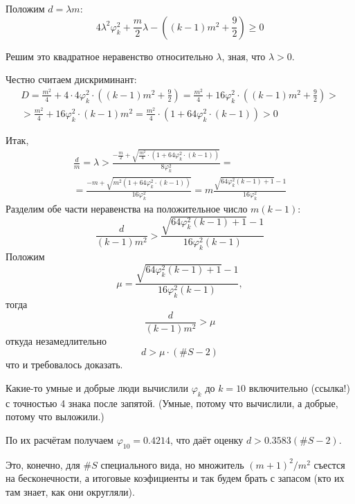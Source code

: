 Положим $d = \lambda m$:
\begin{equation}
	 4 \lambda^2 \varphi_k^2 + \frac{m}{2} \lambda - \left( (k-1)m^2 + \frac{9}{2}\right) \geq 0
\end{equation}

Решим это квадратное неравенство относительно $\lambda$,
зная, что $\lambda > 0$.

Честно считаем дискриминант:
\begin{multline}
	D =
	\frac{m^2}{4} + 4 \cdot 4 \varphi_k^2 \cdot \left( (k-1)m^2 + \frac{9}{2}\right)
	=
	\frac{m^2}{4} + 16 \varphi_k^2 \cdot \left( (k-1)m^2 + \frac{9}{2}\right)
	>\\>
	\frac{m^2}{4} + 16 \varphi_k^2 \cdot (k-1)m^2
	=
	\frac{m^2}{4} \cdot (1 + 64 \varphi_k^2 \cdot (k-1))
	> 0
\end{multline}

Итак,
\begin{multline}
	\frac{d}{m} = \lambda >
	\frac{-\frac{m}{2} + \sqrt{\frac{m^2}{4} \cdot (1 + 64 \varphi_k^2 \cdot (k-1))} }{8 \varphi_k^2}
	=\\=
	\frac{-m + \sqrt{m^2  (1 + 64 \varphi_k^2 \cdot (k-1))} }{16 \varphi_k^2}
	=
	m\frac{ \sqrt{ 64 \varphi_k^2 (k-1) + 1} -1 }{16 \varphi_k^2}
\end{multline}
Разделим обе части неравенства на положительное число $m(k-1)$:
\begin{equation}
	\frac{d}{(k-1)m^2}
	>
	\frac{ \sqrt{ 64 \varphi_k^2 (k-1) + 1} -1 }{16 \varphi_k^2 (k-1)}
\end{equation}
Положим
\begin{equation}
	\mu = \frac{ \sqrt{ 64 \varphi_k^2 (k-1) + 1} -1 }{16 \varphi_k^2 (k-1)},
\end{equation}
тогда
\begin{equation}
	\frac{d}{(k-1)m^2}
	>
	\mu
\end{equation}
откуда незамедлительно
\begin{equation}
	d > \mu \cdot (\#S-2)
\end{equation}
что и требовалось доказать.

Какие-то умные и добрые люди вычислили $\varphi_k$ до $k=10$ включительно (ссылка!) с точностью 4 знака после запятой.
(Умные, потому что вычислили, а добрые, потому что выложили.)

По их расчётам получаем $\varphi_{10} = 0.4214$,
что даёт оценку $d>0.3583(\#S-2)$.

Это, конечно, для $\#S$ специального вида, но множитель $(m+1)^2 / m^2$ съестся на бесконечности,
а итоговые коэфициенты и так будем брать с запасом (кто их там знает, как они округляли).

